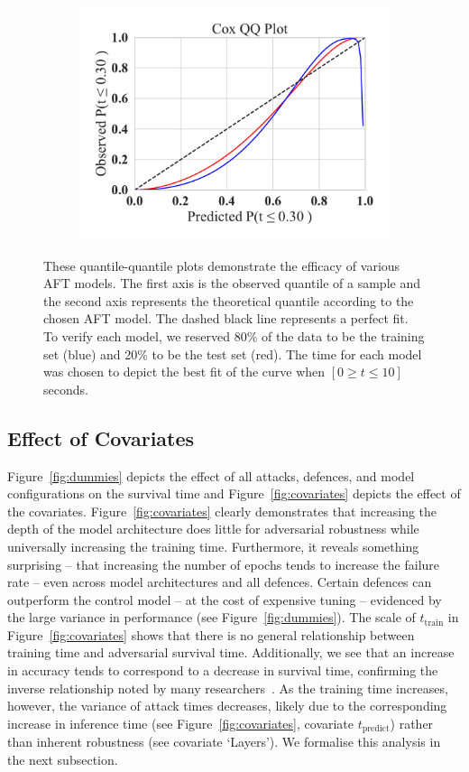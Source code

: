 \begin{figure}
\begin{subfigure}
	\end{subfigure}
	\begin{subfigure}
		\centering
		\includegraphics[width=.30\textwidth,trim={20pt 20pt 20pt 20pt},clip]{plots/cox_qq.pdf}
	\end{subfigure}
	\caption{These quantile-quantile plots demonstrate the efficacy of various AFT models. The first axis is the observed quantile of a sample and the second axis represents the theoretical quantile according to the chosen AFT model. The dashed black line represents a perfect fit. To verify each model, we reserved 80\% of the data to be the training set (blue) and 20\% to be the test set (red). The time for each model was chosen to depict the best fit of the curve when $ [ 0 \geq t \leq 10 ] $ seconds.
 }
	\label{fig:afr_models}
\end{figure}

\subsection{Effect of Covariates}
Figure~\ref{fig:dummies} depicts the effect of all attacks, defences, and model configurations on the survival time and Figure~\ref{fig:covariates} depicts the effect of the covariates.
Figure~\ref{fig:covariates} clearly demonstrates that increasing the depth of the model architecture does little for adversarial robustness while universally increasing the training time.
Furthermore, it reveals something surprising -- that increasing the number of epochs tends to increase the failure rate -- even across model architectures and all defences.
Certain defences can outperform the control model -- at the cost of expensive tuning -- evidenced by the large variance in performance (see Figure~\ref{fig:dummies}). The scale of $t_{\mathrm{train}}$  in Figure~\ref{fig:covariates} shows that there is no general relationship between training time and adversarial survival time. Additionally, we see that an increase in accuracy tends to correspond to a decrease in survival time, confirming the inverse relationship noted by many researchers~\cite{carlini_towards_2017,biggio_evasion_2013,croce_reliable_2020}.
As the training time increases, however, the variance of attack times decreases, likely due to the corresponding increase in inference time (see Figure~\ref{fig:covariates}, covariate $t_{\mathrm{predict}}$) rather than inherent robustness (see covariate `Layers').
We formalise this analysis in the next subsection.

